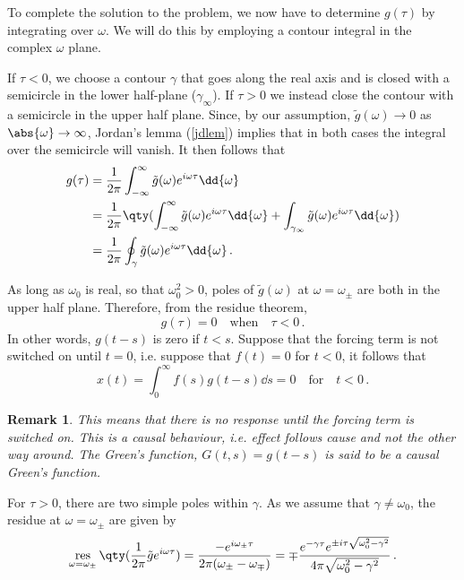 \documentclass{article}
\theoremstyle{plain}\theoremheaderfont{\normalfont\itshape}\theorembodyfont{\rmfamily}\theoremseparator{.}\newtheorem*{rem}{Remark}\newtheorem*{ex}{Example}\newtheorem*{proof}{Proof}\newtheorem*{altp}{Alternative proof}
\theoremstyle{plain}\theoremheaderfont{\normalfont\bfseries}\theorembodyfont{\rmfamily}\theoremseparator{.}\newtheorem{thm}{Theorem}[section]\newtheorem{lem}[thm]{Lemma}\newtheorem{prop}[thm]{Proposition}\newtheorem*{cor}{Corollary}\newtheorem{defn}[thm]{Definition}\newtheorem{clm}[thm]{Claim}\newtheorem{clminproof}{Claim}
\theoremstyle{break}\theoremheaderfont{\normalfont\itshape}\theorembodyfont{\rmfamily}\theoremseparator{.\medskip}\newtheorem*{proofskip}{Proof}\newtheorem*{exs}{Examples}\newtheorem*{rems}{Remarks}
\theoremstyle{break}\theoremheaderfont{\normalfont\bfseries}\theorembodyfont{\rmfamily}\theoremseparator{.\medskip}\newtheorem{lemskip}[thm]{Lemma}\newtheorem{defnskip}[thm]{Definition}\newtheorem{propskip}[thm]{Proposition}\newtheorem{thmskip}[thm]{Theorem}
\numberwithin{equation}{section}
\DeclareMathOperator*{\res}{res}
\begin{document}
	To complete the solution to the problem, we now have to determine \(g(\tau)\) by integrating over \(\omega\). We will do this by employing a contour integral in the complex \(\omega\) plane.

	If \(\tau<0\), we choose a contour \(\gamma\) that goes along the real axis and is closed with a semicircle in the lower half-plane (\(\gamma_\infty\)). If \(\tau>0\) we instead close the contour with a semicircle in the upper half plane. Since, by our assumption, \(\tilde{g}(\omega)\to 0\) as \(\abs{\omega}\to\infty\), Jordan's lemma (\cref{jdlem}) implies that in both cases the integral over the semicircle will vanish. It then follows that
	\begin{align*}
		g(\tau)&=\frac{1}{2\pi}\int_{-\infty}^{\infty}\tilde{g}(\omega)e^{i\omega\tau}\dd{\omega}\\
		&=\frac{1}{2\pi}\qty(\int_{-\infty}^{\infty}\tilde{g}(\omega)e^{i\omega\tau}\dd{\omega}+\int_{\gamma_\infty}\tilde{g}(\omega)e^{i\omega\tau}\dd{\omega})\\
		&=\frac{1}{2\pi}\oint_\gamma\tilde{g}(\omega)e^{i\omega\tau}\dd{\omega}\,.
	\end{align*}

	As long as \(\omega_0\) is real, so that \(\omega_0^2>0\), poles of \(\tilde{g}(\omega)\) at \(\omega=\omega_\pm\) are both in the upper half plane. Therefore, from the residue theorem,
	\[g(\tau)=0\quad\text{when}\quad\tau<0\,.\]
	In other words, \(g(t-s)\) is zero if \(t<s\). Suppose that the forcing term is not switched on until \(t=0\), i.e. suppose that \(f(t)=0\) for \(t<0\), it follows that
	\[x(t)=\int_{0}^{\infty}f(s)g(t-s)\dd{s}=0\quad\text{for}\quad t<0\,.\]
	\begin{rem}
		This means that there is no response until the forcing term is switched on. This is a \textit{causal behaviour}, i.e. effect follows cause and not the other way around. The Green's function, \(G(t,s)=g(t-s)\) is said to be a \textit{causal Green's function.}
	\end{rem}

	For \(\tau>0\), there are two simple poles within \(\gamma\). As we assume that \(\gamma\ne\omega_0\), the residue at \(\omega=\omega_\pm\) are given by
	\[\res_{\omega=\omega_\pm}\qty(\frac{1}{2\pi}\tilde{g}e^{i\omega\tau})=\frac{-e^{i\omega_\pm\tau}}{2\pi(\omega_\pm-\omega_\mp)}=\mp\frac{e^{-\gamma\tau}e^{\pm i\tau\sqrt{\omega_0^2-\gamma^2}}}{4\pi\sqrt{\omega_0^2-\gamma^2}}\,.\]
\end{document}

